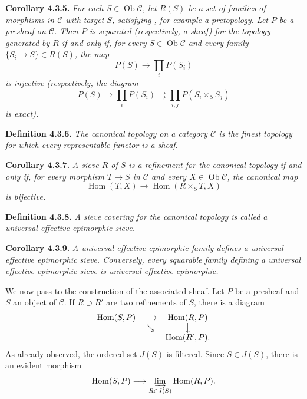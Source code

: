\medskip
\noindent{}\textbf{Corollary 4.3.5.}
\textit{For each \(S\in\operatorname{Ob}\mathscr C\), let
\(R(S)\) be a set of families of morphisms in \(\mathscr C\) with
target \(S\), satisfying , for example a pretopology. Let \(P\) be a
presheaf on \(\mathscr C\). Then \(P\) is separated (respectively, a sheaf)
for the topology generated by \(R\) if and only if, for every
\(S\in\operatorname{Ob}\mathscr C\) and every family
\(\{S_i\to S\}\in R(S)\), the map}
\[
 P(S)\longrightarrow\prod_iP(S_i)
\]
\textit{is injective (respectively, the diagram}
\[
 P(S)\longrightarrow\prod_iP(S_i)
 \rightrightarrows\prod_{i,j}P(S_i\times_SS_j)
\]
\textit{is exact).}

\medskip
\noindent{}\textbf{Definition 4.3.6.}
\textit{The \emph{canonical topology} on a category \(\mathscr C\) is the
finest topology for which every representable functor is a sheaf.}

\medskip
\noindent{}\textbf{Corollary 4.3.7.}
\textit{A sieve \(R\) of \(S\) is a refinement for the canonical topology
if and only if, for every morphism \(T\to S\) in \(\mathscr C\) and every
\(X\in\operatorname{Ob}\mathscr C\), the canonical map}
\[
 \operatorname{Hom}(T,X)\longrightarrow
 \operatorname{Hom}(R\times_ST,X)
\]
\textit{is bijective.}

\medskip
\noindent{}\textbf{Definition 4.3.8.}
\textit{A sieve covering for the canonical topology is called a
\emph{universal effective epimorphic sieve}.}

\medskip
\noindent{}\textbf{Corollary 4.3.9.}
\textit{A universal effective epimorphic family defines a universal
effective epimorphic sieve. Conversely, every squarable family defining a
universal effective epimorphic sieve is universal effective epimorphic.}

We now pass to the construction of the associated sheaf. Let \(P\) be a
presheaf and \(S\) an object of \(\mathscr C\). If \(R\supset R'\) are two
refinements of \(S\), there is a diagram
\[
\begin{array}{ccc}
 \operatorname{Hom}(S,P)&\longrightarrow&\operatorname{Hom}(R,P)\\
 &\searrow&\big\downarrow\\
 &&\operatorname{Hom}(R',P).
\end{array}
\]
As already observed, the ordered set \(J(S)\) is filtered. Since
\(S\in J(S)\), there is an evident morphism
\[
 \operatorname{Hom}(S,P)\longrightarrow
 \varinjlim_{R\in J(S)}\operatorname{Hom}(R,P).
\]


